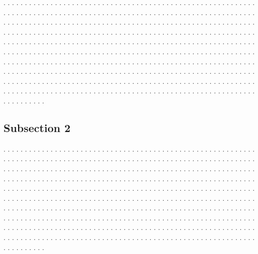 \documentclass[twocolumn]{revtex4}
\begin{document}
. . . . . . . . . . . . . . . . . . . . . . . . . . . . . . . . . . . . . . . .
. . . . . . . . . . . . . . . . . . . . . . . . . . . . . . . . . . . . . . . .
. . . . . . . . . . . . . . . . . . . . . . . . . . . . . . . . . . . . . . . .
. . . . . . . . . . . . . . . . . . . . . . . . . . . . . . . . . . . . . . . .
. . . . . . . . . . . . . . . . . . . . . . . . . . . . . . . . . . . . . . . .
. . . . . . . . . . . . . . . . . . . . . . . . . . . . . . . . . . . . . . . .
. . . . . . . . . . . . . . . . . . . . . . . . . . . . . . . . . . . . . . . .
. . . . . . . . . . . . . . . . . . . . . . . . . . . . . . . . . . . . . . . .
. . . . . . . . . . . . . . . . . . . . . . . . . . . . . . . . . . . . . . . .
. . . . . . . . . . . . . . . . . . . . . . . . . . . . . . . . . . . . . . . .
. . . . . . . . . . . . . . . . . . . . . . . . . . . . . . . . . . . . . . . .
. . . . . . . . . . . . . . . . . . . . . . . . . . . . . . . . . . . . . . . .
. . . . . . . . . . . . . . . . . . . . . . . . . . . . . . . . . . . . . . . .
. . . . . . . . . . . . . . . . . . . . . . . . . . . . . . . . . . . . . . . .
. . . . . . . . . . . . . . . . . . . . . . . . . . . . . . . . . . . . . . . .

\subsection{Subsection 2}

. . . . . . . . . . . . . . . . . . . . . . . . . . . . . . . . . . . . . . . .
. . . . . . . . . . . . . . . . . . . . . . . . . . . . . . . . . . . . . . . .
. . . . . . . . . . . . . . . . . . . . . . . . . . . . . . . . . . . . . . . .
. . . . . . . . . . . . . . . . . . . . . . . . . . . . . . . . . . . . . . . .
. . . . . . . . . . . . . . . . . . . . . . . . . . . . . . . . . . . . . . . .
. . . . . . . . . . . . . . . . . . . . . . . . . . . . . . . . . . . . . . . .
. . . . . . . . . . . . . . . . . . . . . . . . . . . . . . . . . . . . . . . .
. . . . . . . . . . . . . . . . . . . . . . . . . . . . . . . . . . . . . . . .
. . . . . . . . . . . . . . . . . . . . . . . . . . . . . . . . . . . . . . . .
. . . . . . . . . . . . . . . . . . . . . . . . . . . . . . . . . . . . . . . .
. . . . . . . . . . . . . . . . . . . . . . . . . . . . . . . . . . . . . . . .
. . . . . . . . . . . . . . . . . . . . . . . . . . . . . . . . . . . . . . . .
. . . . . . . . . . . . . . . . . . . . . . . . . . . . . . . . . . . . . . . .
. . . . . . . . . . . . . . . . . . . . . . . . . . . . . . . . . . . . . . . .
. . . . . . . . . . . . . . . . . . . . . . . . . . . . . . . . . . . . . . . .
\end{document}
